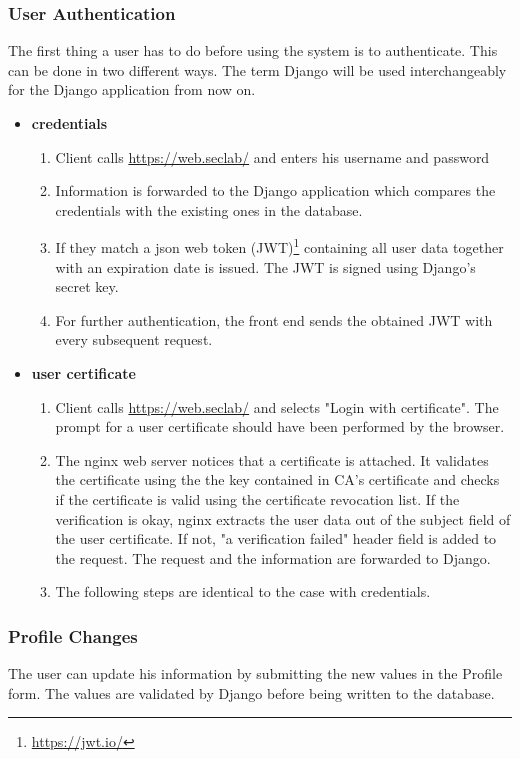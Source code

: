 \documentclass[english]{article}
\begin{document}
 \subsubsection{User Authentication}\label{login}
The first thing a user has to do before using the system is to authenticate. This can be done in two different ways. The term Django will be used interchangeably for the Django application from now on.

\begin{itemize}
\item \textbf{credentials} 
\begin{enumerate}
\item Client calls \url{https://web.seclab/} and enters his username and password
\item Information is forwarded to the Django application which compares the credentials with the existing ones in the database.
\item If they match a json web token (JWT)\footnote{\url{https://jwt.io/}} containing all user data together with an expiration date is issued. The JWT is signed using Django's secret key. 
\item For further authentication, the front end sends the obtained JWT with every subsequent request.
\end{enumerate}
\item \textbf{user certificate}
\begin{enumerate}
\item Client calls \url{https://web.seclab/} and selects "Login with certificate". The prompt for a user certificate should have been performed by the browser. 
\item The nginx web server notices that a certificate is attached. It validates the certificate using the the key contained in CA's certificate and checks if the certificate is valid using the certificate revocation list. If the verification is okay, nginx extracts the user data out of the subject field of the user certificate. If not, "a verification failed" header field is added to the request. The request and the information are forwarded to Django.

\item The following steps are identical to the case with credentials.
\end{enumerate}
\end{itemize}

 \subsubsection{Profile Changes}\label{profile}
 The user can update his information by submitting the new values in the Profile form. The values are validated by Django before being written to the database.
 
\end{document}
